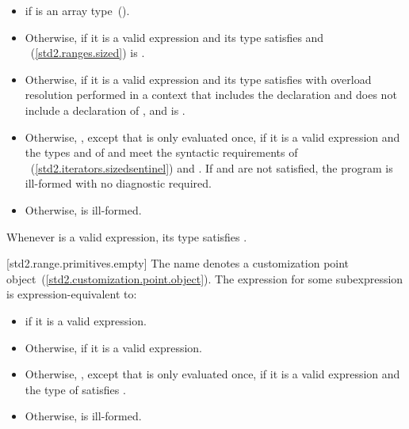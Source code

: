 \begin{itemize}
\item
   if  is an array
  type~().

\item
  Otherwise,  if it is a valid expression and its type 
  satisfies  and
  ~(\ref{std2.ranges.sized}) is
  .

\item
  Otherwise,  if it is a valid expression and its type 
  satisfies  with overload resolution
  performed in a context that includes the declaration
   and does not include
  a declaration of , and
   is .

\item
  Otherwise,
  , except that 
  is only evaluated once, if it is a valid expression and the types  and  of
   and  meet the
  syntactic requirements of
  ~(\ref{std2.iterators.sizedsentinel}) and
  . If  and
   are not satisfied, the program is ill-formed with no
  diagnostic required.

\item
  Otherwise,  is ill-formed.
\end{itemize}

\pnum
\enternote Whenever  is a valid expression, its
type satisfies . \exitnote

[std2.range.primitives.empty]{}
\pnum
The name  denotes a customization point
object~(\ref{std2.customization.point.object}). The expression
 for some subexpression  is
expression-equivalent to:

\begin{itemize}
\item
   if it is a valid expression.

\item
  Otherwise,  if it is a valid expression.

\item
  Otherwise, ,
  except that  is only evaluated once, if it is a valid expression and the type of
   satisfies .

\item
  Otherwise,  is ill-formed.
\end{itemize}

